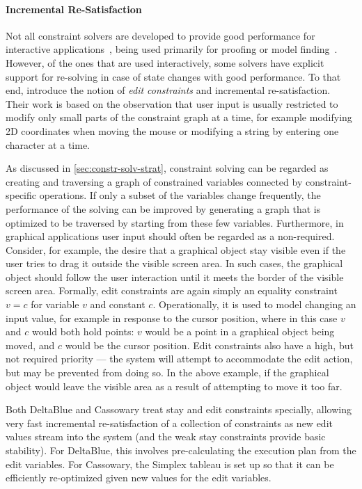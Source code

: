 \paragraph{Incremental Re-Satisfaction}
\label{sec:incr-re-satisf}
Not all constraint solvers are developed to provide good performance
for interactive applications~\cite{freeman-benson-phoenix-1989}, being used
primarily for proofing or model finding~\cite{de2008z3}. However, of
the ones that are used interactively, some solvers have explicit
support for re-solving in case of state changes with good
performance. To that end, \citeauthor{freeman-benson-phoenix-1989} introduce
the notion of \emph{edit constraints} and incremental re-satisfaction.
Their work is based on the observation that user input is usually
restricted to modify only small parts of the constraint graph at a
time, for example modifying 2D coordinates when moving the mouse or
modifying a string by entering one character at a time.

As discussed in \autoref{sec:constr-solv-strat}, constraint solving
can be regarded as creating and traversing a graph of constrained
variables connected by constraint-specific operations. If only a
subset of the variables change frequently, the performance of the
solving can be improved by generating a graph that is optimized to be
traversed by starting from these few variables. Furthermore, in
graphical applications user input should often be regarded as a
non-required. Consider, for example, the desire that a graphical
object stay visible even if the user tries to drag it outside the
visible screen area. In such cases, the graphical object should follow
the user interaction until it meets the border of the visible screen
area. Formally, edit constraints are again simply an equality
constraint $v=c$ for variable $v$ and constant $c$.  Operationally, it
is used to model changing an input value, for example in response to
the cursor position, where in this case $v$ and $c$ would both hold
points: $v$ would be a point in a graphical object being moved, and
$c$ would be the cursor position.  Edit constraints also have a high,
but not required priority --- the system will attempt to accommodate
the edit action, but may be prevented from doing so. In the above
example, if the graphical object would leave the visible area as a
result of attempting to move it too far.

Both DeltaBlue and Cassowary treat stay and edit constraints
specially, allowing very fast incremental re-satisfaction of a
collection of constraints as new edit values stream into the system
(and the weak stay constraints provide basic stability). For
DeltaBlue, this involves pre-calculating the execution plan from the
edit variables. For Cassowary, the Simplex tableau is set up so that
it can be efficiently re-optimized given new values for the edit
variables.

